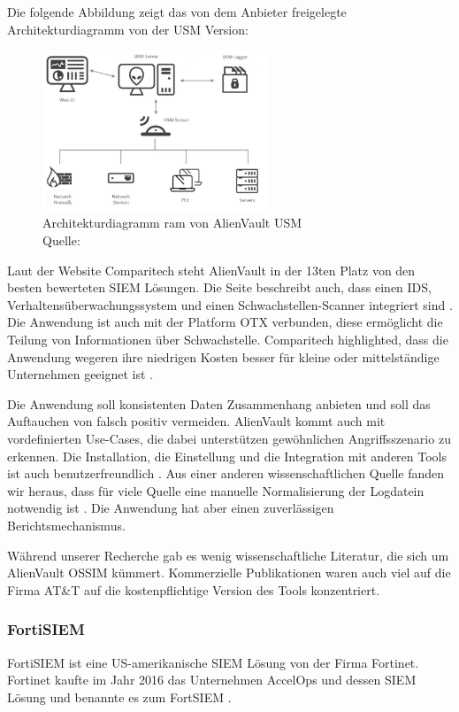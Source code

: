 Die folgende Abbildung zeigt das von dem Anbieter freigelegte Architekturdiagramm von der \gls{USM} Version:

\begin{figure}[H]
   \centering
   \includegraphics[width=0.6\textwidth]{assets/2_p6.png}
   \caption{Architekturdiagramm  ram von AlienVault \gls{USM} \\Quelle: \citep{ATT_AVO} }
   \centering
\end{figure}

Laut der Website Comparitech steht AlienVault in der 13ten Platz von den besten bewerteten \gls{SIEM} Lösungen. Die Seite beschreibt auch, dass einen \gls{IDS}, Verhaltensüberwachungssystem und einen Schwachstellen-Scanner integriert sind . Die Anwendung ist auch mit der Platform \gls{OTX} verbunden, diese ermöglicht die Teilung von Informationen über Schwachstelle. Comparitech highlighted, dass die Anwendung wegeren ihre niedrigen Kosten besser für kleine oder mittelständige Unternehmen geeignet ist \citep{comparitech_SIEM}. 

Die Anwendung soll konsistenten Daten Zusammenhang anbieten und soll das Auftauchen von \gls{falsch positiv} vermeiden. AlienVault kommt auch mit vordefinierten Use-Cases, die dabei unterstützen gewöhnlichen Angriffsszenario zu erkennen. Die Installation, die Einstellung und die Integration mit anderen Tools ist auch benutzerfreundlich \citep{Gomes_AV}. Aus einer anderen wissenschaftlichen Quelle fanden wir heraus, dass für viele  Quelle eine manuelle Normalisierung der Logdatein notwendig ist \cite{Nabil_AV}. Die Anwendung hat aber einen zuverlässigen Berichtsmechanismus.

Während unserer Recherche gab es wenig wissenschaftliche Literatur, die sich um AlienVault OSSIM kümmert. Kommerzielle Publikationen waren auch viel auf die Firma AT\&T auf die kostenpflichtige Version des Tools konzentriert.

\subsubsection{FortiSIEM}
FortiSIEM ist eine US-amerikanische \gls{SIEM} Lösung von der Firma Fortinet. Fortinet kaufte im Jahr 2016 das Unternehmen AccelOps und dessen \gls{SIEM} Lösung und benannte es zum FortSIEM \citep{Fortinet_Press}. 

